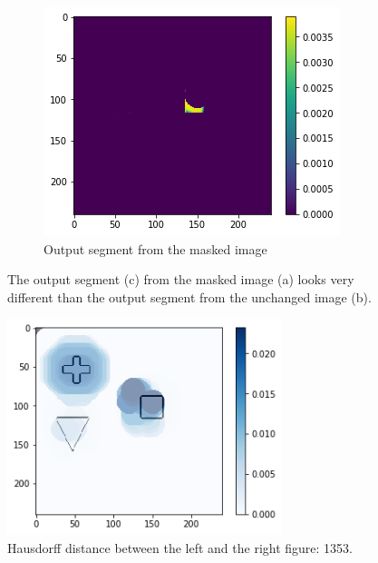 \begin{figure}[H]
        \begin{subfigure}{.33\textwidth}
        \centering
        \includegraphics[width=\linewidth]{chapters/06_hdm/visualization/segment.png}
        \caption{Output segment from the masked image}
    \end{subfigure}
    \caption{The output segment (c) from the masked image (a) looks very different than the output segment from the unchanged image (b).}
    \label{hdm_visualization_sample}
\end{figure}

\begin{figure}[H]
    \centering
    \includegraphics[width=8cm]{chapters/06_hdm/visualization/hdm_raw.png}
    \caption{Hausdorff distance between the left and the right figure: 1353. }
    \label{hdm_visualization_raw}
\end{figure}


